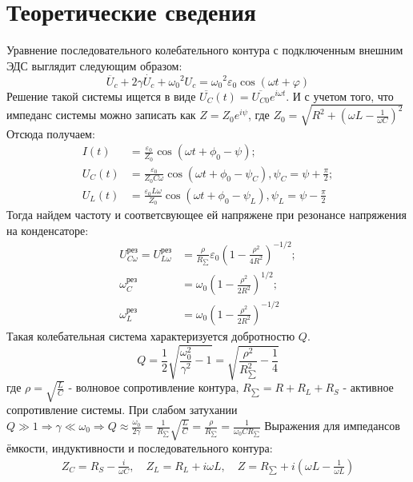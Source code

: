 \section*{Теоретические сведения}
\indent Уравнение последовательного колебательного контура с подключенным внешним ЭДС выглядит следующим образом:
\begin{equation}
    \ddot{U_c} + 2\gamma\dot{U_c} + {\omega_0}^2 U_c = {\omega_0}^2\varepsilon_0\cos(\omega t + \varphi)
\end{equation}
Решение такой системы ищется в виде $\overline{U_C}(t) = \overline{U_{C0}}e^{i\omega t}$.
И с учетом того, что импеданс системы можно записать как $Z = Z_0 e^{i\psi}$, где $Z_0 = \sqrt{R^2 + {\left (\omega L - \frac{1}{\omega C}\right )}^2}$\\
Отсюда получаем:
\begin{align}
    I(t)   &= \frac{\varepsilon_0}{Z_0}\cos(\omega t + \phi_0 - \psi);\\
    U_C(t) &= \frac{\varepsilon_0}{Z_0 C\omega}\cos(\omega t + \phi_0 - \psi_C), \psi_C = \psi + \frac{\pi}{2};\\
    U_L(t) &= \frac{\varepsilon_0 L \omega}{Z_0}\cos(\omega t + \phi_0 - \psi_L), \psi_L = \psi - \frac{\pi}{2}
\end{align}
Тогда найдем частоту и соответсвующее ей напряжене при резонансе напряжения на конденсаторе:
\begin{align}
    U_{C\omega}^{\text{рез}} = U_{L\omega}^{\text{рез}} &= \frac{\rho}{R_\sum}\varepsilon_0 {\left ( 1 - \frac{{\rho}^2}{4 R^2}\right)}^{-1/2};\\
    \omega_C^{\text{рез}}  &= \omega_0 {\left ( 1 - \frac{{\rho}^2}{2 R^2}\right )}^{1/2};\\
    \omega_L^{\text{рез}}  &= \omega_0 {\left ( 1 - \frac{{\rho}^2}{2 R^2}\right )}^{-1/2}
\end{align}
Такая колебательная система характеризуется добротностю $Q$.
\begin{equation}
    Q = \frac{1}{2}\sqrt{\frac{\omega_0^2}{\gamma^2} - 1} = \sqrt{\frac{\rho^2}{R_{\sum}^2} - \frac{1}{4}}
\end{equation}
где $\rho = \sqrt{\frac{L}{C}}$ - волновое сопротивление контура, $R_{\sum} = R + R_L + R_S$ - активное сопротивление системы.
При слабом затухании $Q \gg 1 \Rightarrow \gamma \ll \omega_0 \Rightarrow Q \approx \frac{\omega_0}{2\gamma} = \frac{1}{R_{\sum}}\sqrt{\frac{L}{C}} = \frac{\rho}{R_{\sum}} = \frac{1}{\omega_0 C R_{\sum}}$
Выражения для импедансов ёмкости, индуктивности и последовательного контура:
\begin{align}
    Z_C = R_S - \frac{i}{\omega C},\quad
    Z_L = R_L + i\omega L,\quad
    Z   = R_{\sum} + i\left (\omega L - \frac{1}{\omega L}\right )
\end{align}



